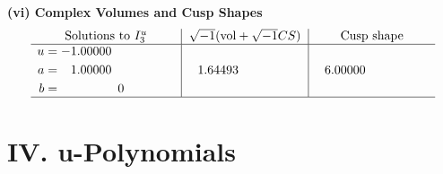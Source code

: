 \documentclass[1p]{elsarticle_modified}
\theoremstyle{definition}
\newcommand{\I}{\sqrt{-1}}
\begin{document}
\newpage\flushleft \textbf{(vi) Complex Volumes and Cusp Shapes}
$$\begin{array}{c|c|c}  
\text{Solutions to }I^u_{3}& \I (\text{vol} + \sqrt{-1}CS) & \text{Cusp shape}\\
 \hline 
\begin{aligned}
u &= -1.00000\phantom{ +0.000000I} \\
a &= \phantom{-}1.00000\phantom{ +0.000000I} \\
b &= \phantom{-0.000000 } 0\end{aligned}
 & \phantom{-}1.64493\phantom{ +0.000000I} & \phantom{-}6.00000\phantom{ +0.000000I}\\
 \hline 
 \end{array}$$\newpage
\newpage\renewcommand{\arraystretch}{1}
\centering \section*{ IV. u-Polynomials}
\end{document}
